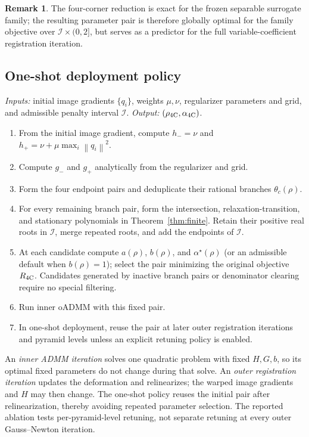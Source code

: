 \documentclass[pdflatex,iicol,sn-mathphys-num]{sn-jnl}
\theoremstyle{definition}
\newtheorem{remark}[theorem]{Remark}
\newcommand{\norm}[1]{\left\lVert #1\right\rVert}
\begin{document}
\begin{remark}
The four-corner reduction is exact for the frozen separable surrogate family;
the resulting parameter pair is therefore globally optimal for the family
objective over $\mathcal I\times(0,2]$, but serves as a predictor for the full
variable-coefficient registration iteration.
\end{remark}

\subsection{One-shot deployment policy}
\begin{algorithm}[t]
\caption{One-Shot Four-Corner oADMM Tuning}
\label{alg:oneshot}
\footnotesize
\emph{Inputs:} initial image gradients $\{q_i\}$, weights $\mu,\nu$, regularizer
parameters and grid, and admissible penalty interval $\mathcal I$.
\emph{Output:} $(\rho_{\rm 4C},\alpha_{\rm 4C})$.
\begin{enumerate}
\item From the initial image gradient, compute
$h_-=\nu$ and $h_+=\nu+\mu\max_i\norm{q_i}^2$.
\item Compute $g_-$ and $g_+$ analytically from the regularizer and grid.
\item Form the four endpoint pairs and deduplicate their rational branches
$\theta_c(\rho)$.
\item For every remaining branch pair, form the intersection,
relaxation-transition, and stationary polynomials in
Theorem~\ref{thm:finite}. Retain
their positive real roots in $\mathcal I$, merge repeated roots, and add the
endpoints of $\mathcal I$.
\item At each candidate compute $a(\rho)$, $b(\rho)$, and
$\alpha^\star(\rho)$ (or an admissible default when $b(\rho)=1$); select
the pair minimizing the original objective $R_{\rm 4C}$. Candidates generated
by inactive branch pairs or denominator clearing require no special filtering.
\item Run inner oADMM with this fixed pair.
\item In one-shot deployment, reuse the pair at later outer registration
iterations and pyramid levels unless an explicit retuning policy is enabled.
\end{enumerate}
\end{algorithm}

An \emph{inner ADMM iteration} solves one quadratic problem with fixed
$H,G,b$, so its optimal fixed parameters do not change during that solve. An
\emph{outer registration iteration} updates the deformation and relinearizes;
the warped image gradients and $H$ may then change. The one-shot policy reuses
the initial pair after relinearization, thereby avoiding repeated parameter
selection. The reported ablation tests
per-pyramid-level retuning, not separate retuning at every outer
Gauss--Newton iteration.
\end{document}
